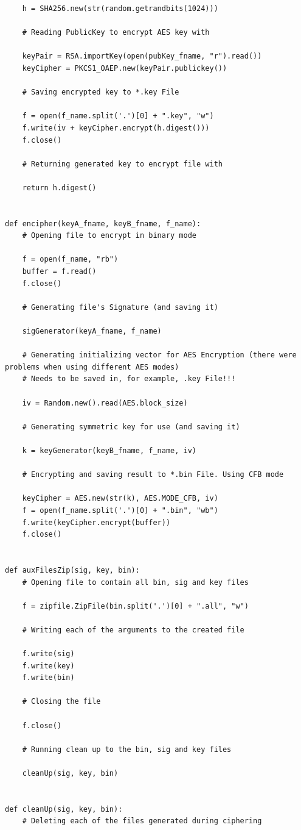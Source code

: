 \documentclass[a4paper,11pt,openright,oneside]{report}
\begin{document}
\begin{appendices}
\begin{verbatim}
    h = SHA256.new(str(random.getrandbits(1024)))

    # Reading PublicKey to encrypt AES key with

    keyPair = RSA.importKey(open(pubKey_fname, "r").read())
    keyCipher = PKCS1_OAEP.new(keyPair.publickey())

    # Saving encrypted key to *.key File

    f = open(f_name.split('.')[0] + ".key", "w")
    f.write(iv + keyCipher.encrypt(h.digest()))
    f.close()

    # Returning generated key to encrypt file with

    return h.digest()


def encipher(keyA_fname, keyB_fname, f_name):
    # Opening file to encrypt in binary mode

    f = open(f_name, "rb")
    buffer = f.read()
    f.close()

    # Generating file's Signature (and saving it)

    sigGenerator(keyA_fname, f_name)

    # Generating initializing vector for AES Encryption (there were problems when using different AES modes)
    # Needs to be saved in, for example, .key File!!!

    iv = Random.new().read(AES.block_size)

    # Generating symmetric key for use (and saving it)

    k = keyGenerator(keyB_fname, f_name, iv)

    # Encrypting and saving result to *.bin File. Using CFB mode

    keyCipher = AES.new(str(k), AES.MODE_CFB, iv)
    f = open(f_name.split('.')[0] + ".bin", "wb")
    f.write(keyCipher.encrypt(buffer))
    f.close()


def auxFilesZip(sig, key, bin):
    # Opening file to contain all bin, sig and key files

    f = zipfile.ZipFile(bin.split('.')[0] + ".all", "w")

    # Writing each of the arguments to the created file

    f.write(sig)
    f.write(key)
    f.write(bin)

    # Closing the file

    f.close()

    # Running clean up to the bin, sig and key files

    cleanUp(sig, key, bin)


def cleanUp(sig, key, bin):
    # Deleting each of the files generated during ciphering


\end{verbatim}
\end{appendices}
\end{document}
